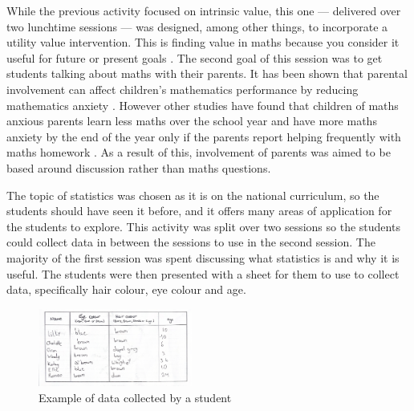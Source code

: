 \documentclass[11pt, a4paper, notitlepage]{article}
\begin{document}
While the previous activity focused on intrinsic value, this one --- delivered over two lunchtime sessions --- was designed, among other things, to incorporate a utility value intervention. This is finding value in maths because you consider it useful for future or present goals \cite{MAES:2024}. The second goal of this session was to get students talking about maths with their parents. It has been shown that parental involvement can affect children's mathematics performance by reducing mathematics anxiety \cite{Vukovic01052013}. However other studies have found that children of maths anxious parents learn less maths over the school year and have more maths anxiety by the end of the year only if the parents report helping frequently with maths homework \cite{Maloney:2015}. As a result of this, involvement of parents was aimed to be based around discussion rather than maths questions.
\par
The topic of statistics was chosen as it is on the national curriculum, so the students should have seen it before, and it offers many areas of application for the students to explore. This activity was split over two sessions so the students could collect data in between the sessions to use in the second session. The majority of the first session was spent discussing what statistics is and why it is useful. The students were then presented with a sheet for them to use to collect data, specifically hair colour, eye colour and age. 
\begin{figure}[h]
    \centering
    \includegraphics[width=0.45\textwidth]{Images/data_collection_example.pdf}
    \caption{Example of data collected by a student}
\end{figure}
\end{document}
